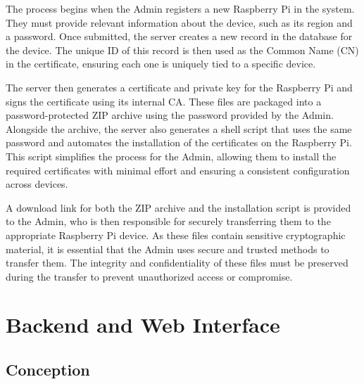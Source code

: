The process begins when the Admin registers a new Raspberry Pi in the system. They must provide relevant information about the device, such as its region and a password. Once submitted, the server creates a new record in the database for the device. The unique ID of this record is then used as the Common Name (CN) in the certificate, ensuring each one is uniquely tied to a specific device.

The server then generates a certificate and private key for the Raspberry Pi and signs the certificate using its internal CA. These files are packaged into a password-protected ZIP archive using the password provided by the Admin. Alongside the archive, the server also generates a shell script that uses the same password and automates the installation of the certificates on the Raspberry Pi. This script simplifies the process for the Admin, allowing them to install the required certificates with minimal effort and ensuring a consistent configuration across devices.

A download link for both the ZIP archive and the installation script is provided to the Admin, who is then responsible for securely transferring them to the appropriate Raspberry Pi device. As these files contain sensitive cryptographic material, it is essential that the Admin uses secure and trusted methods to transfer them. The integrity and confidentiality of these files must be preserved during the transfer to prevent unauthorized access or compromise.



\newpage
\section{Backend and Web Interface}

\subsection{Conception}

